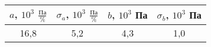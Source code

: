 \begin{tabular}[t]{|c|c|c|c|}
\hline
$a$, $10^3$ $\frac{Па}{\%}$ & $\sigma_a$, $10^3$ $\frac{Па}{\%}$ & $b$, $10^3$ Па & $\sigma_b$, $10^3$ Па \\ 
\hline
16,8 & 5,2 & 4,3 & 1,0 \\ 
\hline
\end{tabular}